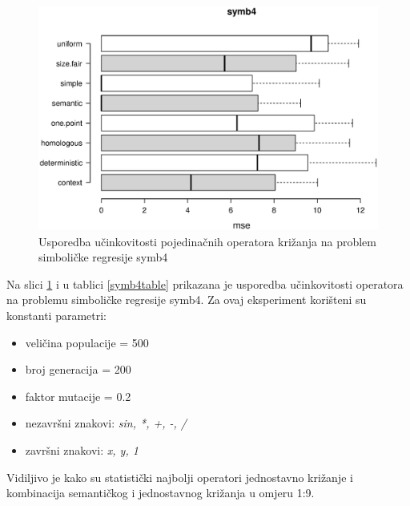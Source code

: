 \begin{figure}[H]
	\centering
	\includegraphics[trim=0cm 4cm 0cm 0cm, scale=0.6]{./slike/boxPlots/symb4.eps}
	\caption{Usporedba učinkovitosti pojedinačnih operatora križanja na problem simboličke regresije symb4}
	\label{symb4box}
\end{figure}

Na slici \ref{symb4box} i u tablici \ref{symb4table} prikazana je usporedba učinkovitosti operatora na problemu simboličke regresije symb4. Za ovaj eksperiment korišteni su konstanti parametri:
\begin{itemize}
\item{veličina populacije = 500}
\item{broj generacija = 200}
\item{faktor mutacije = 0.2}
\item{nezavršni znakovi: \textit{sin, *, +, -, /}}
\item{završni znakovi: \textit{x, y, 1}}
\end{itemize} 

Vidiljivo je kako su statistički najbolji operatori jednostavno križanje i kombinacija semantičkog i jednostavnog križanja u omjeru 1:9. 

